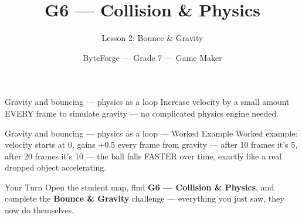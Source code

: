 \documentclass[aspectratio=169]{beamer}
\title{G6 — Collision \& Physics}
\subtitle{Lesson 2: Bounce \& Gravity}
\author{ByteForge --- Grade 7 --- Game Maker}
\date{}
\begin{document}
\begin{frame}
    \titlepage
\end{frame}

\begin{frame}{Gravity and bouncing — physics as a loop}
    \Large
    Increase velocity by a small amount EVERY frame to simulate gravity — no complicated physics engine needed.
\end{frame}

\begin{frame}{Gravity and bouncing — physics as a loop --- Worked Example}
    \Large
    Worked example: velocity starts at 0, gains +0.5 every frame from gravity — after 10 frames it's 5, after 20 frames it's 10 — the ball falls FASTER over time, exactly like a real dropped object accelerating.
\end{frame}

\begin{frame}{Your Turn}
    \Large
    Open the student map, find \textbf{G6 — Collision \& Physics}, and complete
    the \textbf{Bounce \& Gravity} challenge --- everything you just saw, they now do themselves.
\end{frame}
\end{document}
